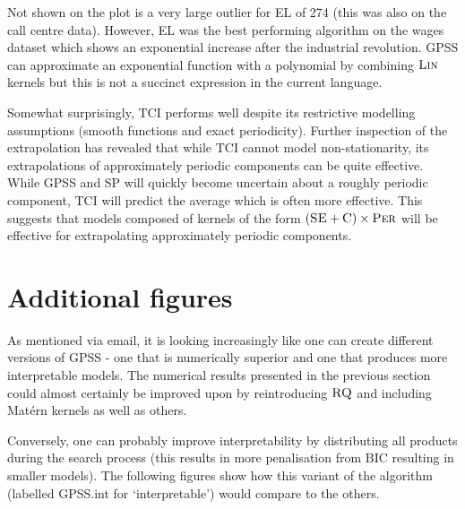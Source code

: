 \documentclass{article}
\begin{document}
Not shown on the plot is a very large outlier for EL of 274 (this was also on the call centre data).
However, EL was the best performing algorithm on the wages dataset which shows an exponential increase after the industrial revolution.
GPSS can approximate an exponential function with a polynomial by combining ${\textsc{Lin}}$ kernels but this is not a succinct expression in the current language.

Somewhat surprisingly, TCI performs well despite its restrictive modelling assumptions (smooth functions and exact periodicity).
Further inspection of the extrapolation has revealed that while TCI cannot model non-stationarity, its extrapolations of approximately periodic components can be quite effective.
While GPSS and SP will quickly become uncertain about a roughly periodic component, TCI will predict the average which is often more effective.
This suggests that models composed of kernels of the form $({\textsc{SE}} + {\textsc{C}}) \times {\textsc{Per}}$ will be effective for extrapolating approximately periodic components.

\section{Additional figures}

As mentioned via email, it is looking increasingly like one can create different versions of GPSS - one that is numerically superior and one that produces more interpretable models.
The numerical results presented in the previous section could almost certainly be improved upon by reintroducing ${\textsc{RQ}}$ and including Mat\'ern kernels as well as others.

Conversely, one can probably improve interpretability by distributing all products during the search process (this results in more penalisation from BIC resulting in smaller models).
The following figures show how this variant of the algorithm (labelled GPSS.int for `interpretable') would compare to the others.
\end{document}

